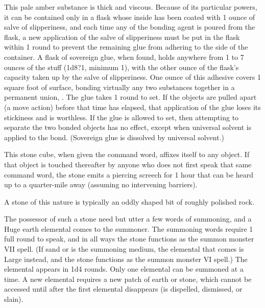 {

 This pale amber substance is thick and viscous. Because of its particular powers, it can be contained only in a flask whose inside has been coated with 1 ounce of salve of slipperiness, and each time any of the bonding agent is poured from the flask, a new application of the salve of slipperiness must be put in the flask within 1 round to prevent the remaining glue from adhering to the side of the container. A flask of sovereign glue, when found, holds anywhere from 1 to 7 ounces of the stuff (1d8?1, minimum 1), with the other ounce of the flask's capacity taken up by the salve of slipperiness. One ounce of this adhesive covers 1 square foot of surface, bonding virtually any two substances together in a permanent union, . The glue takes 1 round to set. If the objects are pulled apart (a move action) before that time has elapsed, that application of the glue loses its stickiness and is worthless. If the glue is allowed to set, then attempting to separate the two bonded objects has no effect, except when universal solvent is applied to the bond. (Sovereign glue is dissolved by universal solvent.)


 This stone cube, when given the command word, affixes itself to any object. If that object is touched thereafter by anyone who does not first speak that same command word, the stone emits a piercing screech for 1 hour that can be heard up to a quarter-mile away (assuming no intervening barriers).


 A stone of this nature is typically an oddly shaped bit of roughly polished rock.

The possessor of such a stone need but  utter a few words of summoning, and a Huge earth elemental comes to the summoner. The summoning words require 1 full round to speak, and in all ways the stone functions as the summon monster VII spell. (If sand or  is the summoning medium, the elemental that comes is Large instead, and the stone functions as the summon monster VI spell.) The elemental appears in 1d4 rounds. Only one elemental can be summoned at a time. A new elemental requires a new patch of earth or stone, which cannot be accessed until after the first elemental disappears (is dispelled, dismissed, or slain).

}
